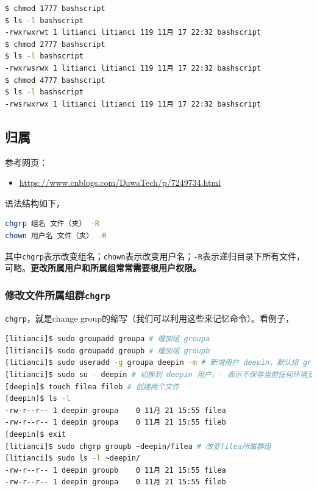 \documentclass[doctor,openright,twoside]{sjtuthesis}
\providecommand{\tightlist}{%
    \setlength{\itemsep}{0pt}\setlength{\parskip}{0pt}}
\newcommand{\passthrough}[1]{#1}
\theoremstyle{plain}
\theoremstyle{definition}
\theoremstyle{remark}
\theoremstyle{ocrenumbox}
\theoremstyle{plain}
\begin{document}
\begin{lstlisting}[language=bash]
$ chmod 1777 bashscript 
$ ls -l bashscript 
-rwxrwxrwt 1 litianci litianci 119 11月 17 22:32 bashscript
$ chmod 2777 bashscript 
$ ls -l bashscript 
-rwxrwsrwx 1 litianci litianci 119 11月 17 22:32 bashscript
$ chmod 4777 bashscript 
$ ls -l bashscript 
-rwsrwxrwx 1 litianci litianci 119 11月 17 22:32 bashscript
\end{lstlisting}

\hypertarget{section-68}{%
\subsection{归属}\label{section-68}}

参考网页：

\begin{itemize}
\tightlist
\item
  \url{https://www.cnblogs.com/DawaTech/p/7249734.html}
\end{itemize}

语法结构如下，

\begin{lstlisting}[language=bash]
chgrp 组名 文件（夹） -R
chown 用户名 文件（夹） -R
\end{lstlisting}

其中\passthrough{\lstinline!chgrp!}表示改变组名；\passthrough{\lstinline!chown!}表示改变用户名；\passthrough{\lstinline!-R!}表示递归目录下所有文件，可略。\textbf{更改所属用户和所属组常常需要根用户权限。}

\hypertarget{chgrp}{%
\subsubsection{\texorpdfstring{修改文件所属组群\texttt{chgrp}}{修改文件所属组群chgrp}}\label{chgrp}}

\passthrough{\lstinline!chgrp!}，就是change group的缩写（我们可以利用这些来记忆命令）。看例子，

\begin{lstlisting}[language=bash]
[litianci]$ sudo groupadd groupa # 增加组 groupa
[litianci]$ sudo groupadd groupb # 增加组 groupb
[litianci]$ sudo useradd -g groupa deepin -m # 新增用户 deepin，默认组 groupa,自带主目录
[litianci]$ sudo su - deepin # 切换到 deepin 用户，- 表示不保存当前任何环境变量
[deepin]$ touch filea fileb # 创建两个文件
[deepin]$ ls -l
-rw-r--r-- 1 deepin groupa    0 11月 21 15:55 filea
-rw-r--r-- 1 deepin groupa    0 11月 21 15:55 fileb
[deepin]$ exit
[litianci]$ sudo chgrp groupb ~deepin/filea # 改变filea所属群组
[litianci]$ sudo ls -l ~deepin/
-rw-r--r-- 1 deepin groupb    0 11月 21 15:55 filea
-rw-r--r-- 1 deepin groupa    0 11月 21 15:55 fileb
\end{lstlisting}
\end{document}
